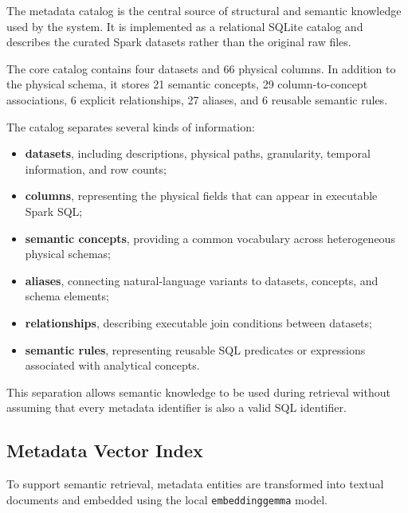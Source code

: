 The metadata catalog is the central source of structural and semantic
knowledge used by the system. It is implemented as a relational SQLite
catalog and describes the curated Spark datasets rather than the original raw
files.

The core catalog contains four datasets and 66 physical columns. In addition
to the physical schema, it stores 21 semantic concepts, 29 column-to-concept
associations, 6 explicit relationships, 27 aliases, and 6 reusable semantic
rules.

The catalog separates several kinds of information:

\begin{itemize}

    \item \textbf{datasets}, including descriptions, physical paths,
    granularity, temporal information, and row counts;

    \item \textbf{columns}, representing the physical fields that can appear
    in executable Spark SQL;

    \item \textbf{semantic concepts}, providing a common vocabulary across
    heterogeneous physical schemas;

    \item \textbf{aliases}, connecting natural-language variants to datasets,
    concepts, and schema elements;

    \item \textbf{relationships}, describing executable join conditions
    between datasets;

    \item \textbf{semantic rules}, representing reusable SQL predicates or
    expressions associated with analytical concepts.

\end{itemize}

This separation allows semantic knowledge to be used during retrieval without
assuming that every metadata identifier is also a valid SQL identifier.


\subsection{Metadata Vector Index}

To support semantic retrieval, metadata entities are transformed into textual
documents and embedded using the local \texttt{embeddinggemma} model.

